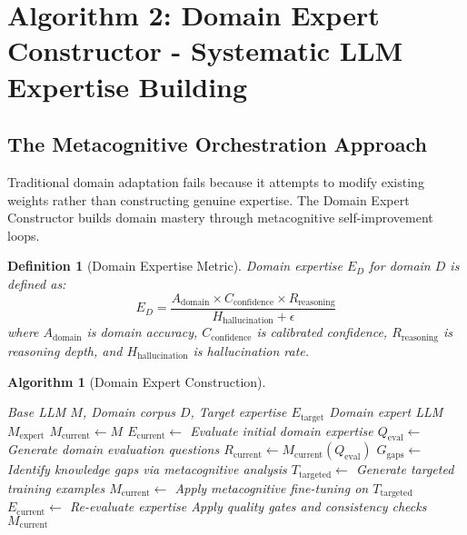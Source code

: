 \documentclass[12pt,a4paper]{article}
\newtheorem{definition}[theorem]{Definition}
\newtheorem{algorithm}[theorem]{Algorithm}
\begin{document}
\section{Algorithm 2: Domain Expert Constructor - Systematic LLM Expertise Building}

\subsection{The Metacognitive Orchestration Approach}

Traditional domain adaptation fails because it attempts to modify existing weights rather than constructing genuine expertise. The Domain Expert Constructor builds domain mastery through metacognitive self-improvement loops.

\begin{definition}[Domain Expertise Metric]
Domain expertise $E_D$ for domain $D$ is defined as:
\begin{equation}
E_D = \frac{A_{\text{domain}} \times C_{\text{confidence}} \times R_{\text{reasoning}}}{H_{\text{hallucination}} + \epsilon}
\end{equation}
where $A_{\text{domain}}$ is domain accuracy, $C_{\text{confidence}}$ is calibrated confidence, $R_{\text{reasoning}}$ is reasoning depth, and $H_{\text{hallucination}}$ is hallucination rate.
\end{definition}

\begin{algorithm}[Domain Expert Construction]
\begin{algorithmic}[1]
\REQUIRE Base LLM $M$, Domain corpus $D$, Target expertise $E_{\text{target}}$
\ENSURE Domain expert LLM $M_{\text{expert}}$
\STATE $M_{\text{current}} \leftarrow M$
\STATE $E_{\text{current}} \leftarrow$ Evaluate initial domain expertise
    \STATE $Q_{\text{eval}} \leftarrow$ Generate domain evaluation questions
    \STATE $R_{\text{current}} \leftarrow M_{\text{current}}(Q_{\text{eval}})$
    \STATE $G_{\text{gaps}} \leftarrow$ Identify knowledge gaps via metacognitive analysis
    \STATE $T_{\text{targeted}} \leftarrow$ Generate targeted training examples
    \STATE $M_{\text{current}} \leftarrow$ Apply metacognitive fine-tuning on $T_{\text{targeted}}$
    \STATE $E_{\text{current}} \leftarrow$ Re-evaluate expertise
    \STATE Apply quality gates and consistency checks
\ENDWHILE
\RETURN $M_{\text{current}}$
\end{algorithmic}
\end{algorithm}
\end{document}
